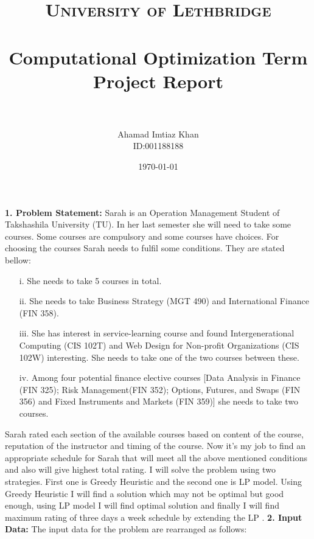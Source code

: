 \documentclass[paper=letter, fontsize=11pt]{scrartcl} %
\title{	
\normalfont \normalsize 
\textsc{University of Lethbridge} \\ [25pt] %
\horrule{0.5pt} \\[0.4cm] %
\huge Computational Optimization Term Project Report\\ %
\horrule{2pt} \\[0.5cm] %
}
\author{Ahamad Imtiaz Khan\\ID:001188188} %
\date{\normalsize\today} %
\begin{document}
\maketitle %



\Large \textbf{1. Problem Statement:}
\normalsize Sarah is an Operation Management Student of Takshashila University (TU). In her 
last semester she will need to take some courses. Some courses are compulsory and some courses have choices.
For choosing the courses Sarah needs to fulfil some conditions. They are stated  bellow:
    
\begin{enumerate} [align=left,style=nextline,leftmargin=1.5cm,labelsep=\parindent,font=\normalfont]
\item[i.] She needs to take 5 courses in total.
\item[ii.] She needs to take Business Strategy (MGT 490) and International Finance (FIN 358).
\item[iii.] She has interest in service-learning course and found Intergenerational Computing (CIS 102T) and Web Design for Non-profit Organizations (CIS 102W) interesting. She needs to take one of the two courses 
between these.
\item[iv.] Among four potential finance elective courses [Data Analysis in Finance (FIN 325);
 Risk Management(FIN 352); Options, Futures, and Swaps (FIN 356) and 
Fixed Instruments and Markets (FIN 359)] she needs to take two courses.
\end{enumerate}

Sarah rated each section of the available courses based on content of the course, reputation of the instructor and timing of the course. Now it's my job to find an appropriate schedule for Sarah that will meet all the above mentioned conditions and also will give highest total rating. I will solve the problem using two strategies. First one is Greedy Heuristic and the second one is LP model. Using Greedy Heuristic I will find a solution which may not be optimal but good enough, using LP model I will find optimal solution and finally I will find maximum rating of three days a week schedule by extending the LP .
\newline
\newline
\Large \textbf{2. Input Data:}
\normalsize The input data for the problem are rearranged as follows: 
\end{document}
